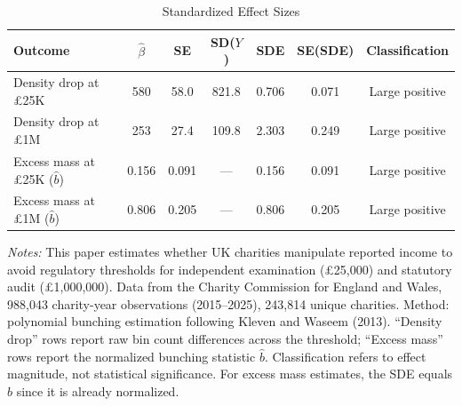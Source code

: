 \begin{table}[htbp]
\centering
\caption{Standardized Effect Sizes}
\label{tab:sde}
\begin{tabular}{lcccccc}
\hline\hline
Outcome & $\hat{\beta}$ & SE & SD($Y$) & SDE & SE(SDE) & Classification \\
\hline
Density drop at \pounds25K & 580 & 58.0 & 821.8 & 0.706 & 0.071 & Large positive \\
Density drop at \pounds1M & 253 & 27.4 & 109.8 & 2.303 & 0.249 & Large positive \\
Excess mass at \pounds25K ($\hat{b}$) & 0.156 & 0.091 & --- & 0.156 & 0.091 & Large positive \\
Excess mass at \pounds1M ($\hat{b}$) & 0.806 & 0.205 & --- & 0.806 & 0.205 & Large positive \\
\hline\hline
\end{tabular}
\begin{tablenotes}[flushleft]
\small
\item \textit{Notes:} This paper estimates whether UK charities manipulate reported income to avoid regulatory thresholds for independent examination (\pounds25,000) and statutory audit (\pounds1,000,000). Data from the Charity Commission for England and Wales, 988,043 charity-year observations (2015--2025), 243,814 unique charities. Method: polynomial bunching estimation following Kleven and Waseem (2013). ``Density drop'' rows report raw bin count differences across the threshold; ``Excess mass'' rows report the normalized bunching statistic $\hat{b}$. Classification refers to effect magnitude, not statistical significance. For excess mass estimates, the SDE equals $\hat{b}$ since it is already normalized.
\end{tablenotes}
\end{table}
